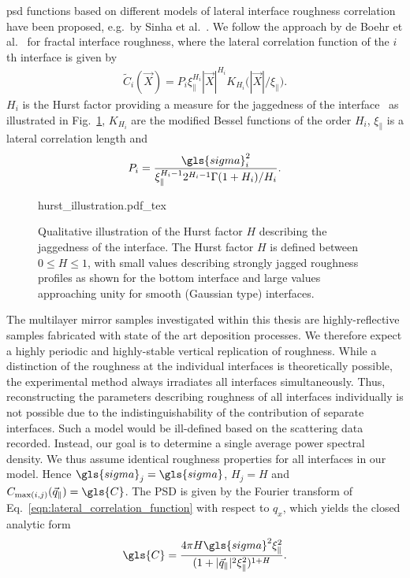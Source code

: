 \Gls{psd} functions based on different models of lateral interface roughness correlation have been proposed, e.g.~by Sinha et al.~\cite{sinha_x-ray_1988}. We follow the approach by de Boehr et al.~\cite{de_boer_influence_1994,de_boer_x-ray_1995} for fractal interface roughness, where the lateral correlation function of the $i$th interface is given by
\begin{align}
\tilde{C}_i(\vec{X}) = P_i \xi_\parallel^{H_i} |\vec{X}|^{H_i} K_{H_i}\Big(|\vec{X}|/\xi_\parallel\Big) \text{.} \label{eqn:lateral_correlation_function}
\end{align}
$H_i$ is the Hurst factor providing a measure for the jaggedness of the interface~\cite{sinha_x-ray_1988} as illustrated in Fig.~\ref{ch_theo:fig_hurst_illustration}, $K_{H_i}$ are the modified Bessel functions of the order $H_i$, $\xi_\parallel$ is a lateral correlation length and
\begin{align}
P_i = \frac{\gls{sigma}_i^2}{\xi_\parallel^{H_i-1} 2^{H_i-1} \Gamma(1+H_i)/H_i}\text{.}
\end{align}
\begin{figure}[htb]
    \def\svgwidth{0.5\textwidth}
    {hurst_illustration.pdf_tex}
    \caption[Qualitative illustration of the Hurst factor.]{Qualitative illustration of the Hurst factor $H$ describing the jaggedness of the interface. The Hurst factor $H$ is defined between $0 \leq H \leq 1$, with small values describing strongly jagged roughness profiles as shown for the bottom interface and large values approaching unity for smooth (Gaussian type) interfaces.}
    \label{ch_theo:fig_hurst_illustration}
\end{figure}

The multilayer mirror samples investigated within this thesis are highly-reflective samples fabricated with state of the art deposition processes. We therefore expect a highly periodic and highly-stable vertical replication of roughness. While a distinction of the roughness at the individual interfaces is theoretically possible, the experimental method always irradiates all interfaces simultaneously. Thus, reconstructing the parameters describing roughness of all interfaces individually is not possible due to the indistinguishability of the contribution of separate interfaces. Such a model would be ill-defined based on the scattering data recorded. Instead, our goal is to determine a single average power spectral density. We thus assume identical roughness properties for all interfaces in our model. Hence $\gls{sigma}_j = \gls{sigma}$, $H_j = H$ and $C_{\text{max}(i,j)}(\vec{q}_\parallel) = \gls{C}$. The PSD is given by the Fourier transform of Eq.~\eqref{eqn:lateral_correlation_function} with respect to $q_x$, which yields the closed analytic form
\begin{equation}
        \gls{C} = \frac{4 \pi H \gls{sigma}^2 \xi_\parallel^2}{(1+|\vec{q}_\parallel|^2\xi_\parallel^2)^{1+H}} \text{.} \label{ch_theo:eqn_psd} 
\end{equation}

